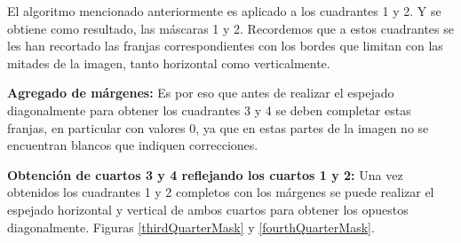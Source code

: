 \documentclass[10pt,a4paper, twoside]{report}
\newcounter{subsubsubsection}[subsubsection]
\begin{document}

El algoritmo mencionado anteriormente es aplicado a los cuadrantes 1 y 2. Y se obtiene como resultado, las máscaras 1 y 2. Recordemos que a estos cuadrantes se les han recortado las franjas correspondientes con los bordes que limitan con las mitades de la imagen, tanto horizontal como verticalmente.

\textbf{Agregado de márgenes:} Es por eso que antes de realizar el espejado diagonalmente para obtener los cuadrantes 3 y 4 se deben completar estas franjas, en particular con valores 0, ya que en estas partes de la imagen no se encuentran blancos que indiquen correcciones.

\textbf{Obtención de cuartos 3 y 4 reflejando los cuartos 1 y 2:} Una vez obtenidos los cuadrantes 1 y 2 completos con los márgenes se puede realizar el espejado horizontal y vertical de ambos cuartos para obtener los opuestos diagonalmente. Figuras \ref{thirdQuarterMask} y \ref{fourthQuarterMask}.
\end{document}

